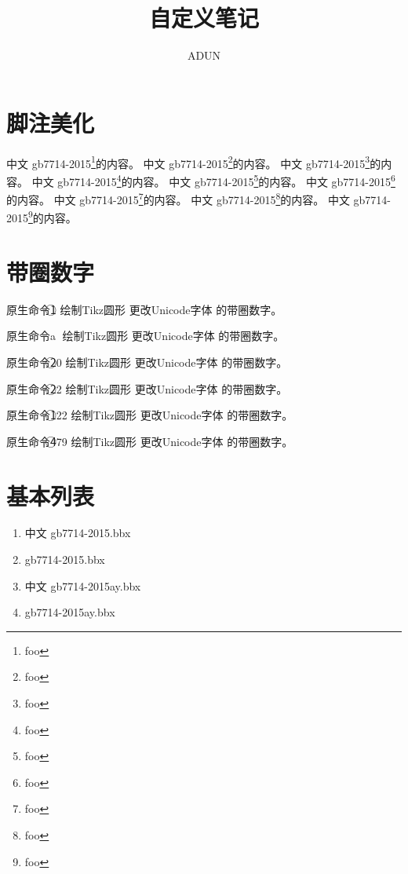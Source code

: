 \documentclass[UTF8,AutoFakeBold,zihao=-4,scheme=chinese]{ctexart}
\begin{document}
\title{自定义笔记}
\author{ADUN}
\maketitle

\section{脚注美化}

中文 gb7714-2015\footnote{foo}的内容。
中文 gb7714-2015\footnote{foo}的内容。
中文 gb7714-2015\footnote{foo}的内容。
中文 gb7714-2015\footnote{foo}的内容。
中文 gb7714-2015\footnote{foo}的内容。
中文 gb7714-2015\footnote{foo}的内容。
中文 gb7714-2015\footnote{foo}的内容。
中文 gb7714-2015\footnote{foo}的内容。
中文 gb7714-2015\footnote{foo}的内容。

\section{带圈数字}

原生命令\textcircled {1} 绘制Tikz圆形 更改Unicode字体  的带圈数字。

原生命令\textcircled {a} 绘制Tikz圆形 更改Unicode字体  的带圈数字。

原生命令\textcircled {20} 绘制Tikz圆形 更改Unicode字体  的带圈数字。

原生命令\textcircled {22} 绘制Tikz圆形 更改Unicode字体  的带圈数字。

原生命令\textcircled {122} 绘制Tikz圆形 更改Unicode字体  的带圈数字。

原生命令\textcircled {479} 绘制Tikz圆形 更改Unicode字体  的带圈数字。

\section{基本列表}

\begin{enumerate}
  \item 中文 gb7714-2015.bbx
  \item gb7714-2015.bbx
  \item 中文 gb7714-2015ay.bbx
  \item gb7714-2015ay.bbx
\end{enumerate}
\end{document}
